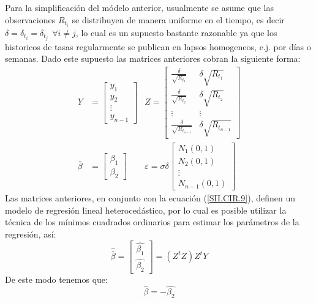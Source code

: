 \documentclass[11pt,notitlepage]{article}
\begin{document}
    Para la simplificación del módelo anterior, usualmente se asume que las observaciones \(R_{t_i}\) se distribuyen de manera uniforme en el tiempo, es decir \(\delta = \delta_{t_i} = \delta_{t_j} \ \ \forall{i \neq j}\), lo cual es un supuesto bastante razonable ya que los historicos de tasas regularmente se publican en lapsos homogeneos, e.j. por días o semanas. Dado este supuesto las matrices anteriores cobran la siguiente forma:
        \begin{align*}
        Y &= \begin{bmatrix}
            y_1\\ 
            y_2\\ 
            \vdots\\
            y_{n-1} 
            \end{bmatrix} &Z = \begin{bmatrix}
            \frac{\delta}{\sqrt{R_{t_1}}} & \delta\sqrt{R_{t_1}}\\ 
            \frac{\delta}{\sqrt{R_{t_2}}} & \delta\sqrt{R_{t_2}}\\ 
            \vdots & \vdots\\ 
            \frac{\delta}{\sqrt{R_{t_{n-1}}}} & \delta\sqrt{R_{t_{n-1}}}
            \end{bmatrix}\\
        \bar{\beta} &= \begin{bmatrix}
            \beta_1\\ 
            \beta_2
       \end{bmatrix} &\varepsilon = \sigma\delta\begin{bmatrix}
            N_{1}(0,1)\\ 
            N_{2}(0,1)\\ 
            \vdots\\ 
            N_{n-1}(0,1)
            \end{bmatrix}
        \end{align*}
    Las matrices anteriores, en conjunto con la ecuación (\ref{SII.CIR.9}), definen un modelo de regresión lineal heterocedástico, por lo cual es posible utilizar la técnica de los mínimos cuadrados ordinarios para estimar los parámetros de la regresión, así:
    \[\hat{\bar{\beta}} = \begin{bmatrix}
            \hat{\beta_1}\\ 
            \hat{\beta_2}
       \end{bmatrix} = \left(Z^{t}Z\right)Z^{t}Y\] 
    De este modo tenemos que: 
    \begin{equation*}
        \hat{\beta} = -\hat{\beta_2}
    \end{equation*}
\end{document}
